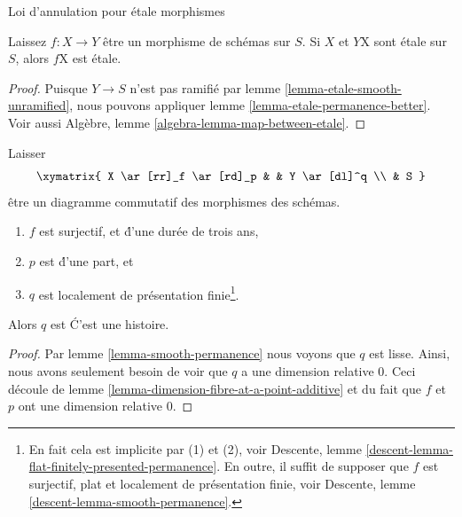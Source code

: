 \begin{lemma}

\label{lemma-etale-permanence}

\begin{slogan}
Loi d'annulation pour \'etale morphismes
\end{slogan}
Laissez $f : X \to Y$ être un morphisme de schémas sur $S$. Si $X$ et $Y$X sont \'etale sur $S$, alors $f$X est \'etale.
\end{lemma}

\begin{proof}
Puisque $Y \to S$ n'est pas ramifié par lemme \ref{lemma-etale-smooth-unramified}, nous pouvons appliquer lemme \ref{lemma-etale-permanence-better}. Voir aussi Algèbre, lemme \ref{algebra-lemma-map-between-etale}.
\end{proof}

\begin{lemma}

\label{lemma-etale-permanence-two}

Laisser
$$
\xymatrix{
X \ar[rr]_f \ar[rd]_p & &
Y \ar[dl]^q \\
& S
}
$$
être un diagramme commutatif des morphismes des schémas.

\begin{enumerate}

\item  $f$ est surjectif, et \'d'une durée de trois ans,
\item  $p$ est \'d'une part, et
\item  $q$ est localement de présentation finie\footnote{En fait cela est implicite par (1) et (2), voir Descente, lemme \ref{descent-lemma-flat-finitely-presented-permanence}. En outre, il suffit de supposer que $f$ est surjectif, plat et localement de présentation finie, voir Descente, lemme \ref{descent-lemma-smooth-permanence}.}.

\end{enumerate}

Alors $q$ est \'C'est une histoire.

\end{lemma}

\begin{proof}
Par lemme \ref{lemma-smooth-permanence} nous voyons que $q$ est lisse. Ainsi, nous avons seulement besoin de voir que $q$ a une dimension relative $0$. Ceci découle de lemme \ref{lemma-dimension-fibre-at-a-point-additive} et du fait que $f$ et $p$ ont une dimension relative $0$.
\end{proof}


